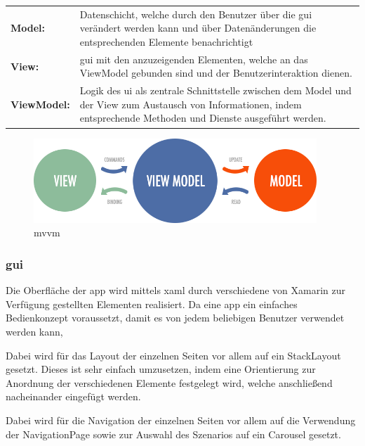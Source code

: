 \begin{tabular}{p{2.5cm} p{12.25cm}}
	\textbf{Model:} & Datenschicht, welche durch den Benutzer über die \gls{gui} verändert werden kann und über Datenänderungen die entsprechenden Elemente benachrichtigt \\
	\textbf{View:} & \gls{gui} mit den anzuzeigenden Elementen, welche an das ViewModel gebunden sind und der Benutzerinteraktion dienen. \\
	\textbf{ViewModel:} & Logik des \gls{ui} als zentrale Schnittstelle zwischen dem Model und der View zum Austausch von Informationen, indem entsprechende Methoden und Dienste ausgeführt werden. \\
\end{tabular}

\bigskip

\begin{figure}[h]
	\begin{center}
		\includegraphics[width=0.95\textwidth]{images/implementation/mvvm.png}
	\end{center}	
	\caption{\acrlong{mvvm} \cite{Brecht.MVVMEntity}}
	\label{fig:mvvm}
\end{figure}

\newpage
\subsubsection{\acrfull{gui}} %

Die Oberfläche der \gls{app} wird mittels \gls{xaml} durch verschiedene von Xamarin zur Verfügung gestellten Elementen realisiert. Da eine \gls{app} ein einfaches Bedienkonzept voraussetzt, damit es von jedem beliebigen Benutzer verwendet werden kann,


Dabei wird für das Layout der einzelnen Seiten vor allem auf ein StackLayout gesetzt. Dieses ist sehr einfach umzusetzen, indem eine Orientierung zur Anordnung der verschiedenen Elemente festgelegt wird, welche anschließend nacheinander eingefügt werden. 




 Dabei wird für die Navigation der einzelnen Seiten vor allem auf die Verwendung der NavigationPage sowie zur Auswahl des Szenarios auf ein Carousel gesetzt. 




